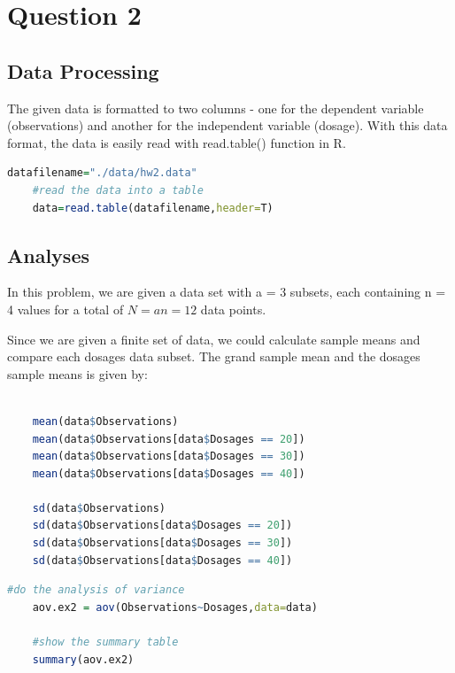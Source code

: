 \documentclass[11pt]{article}
\begin{document}
\clearpage






\section{Question 2}

\subsection{Data Processing}
The given data is formatted to two columns - one for the dependent variable (observations) and another for the independent variable (dosage). With this data format, the data is easily read with read.table() function in R.

\begin{lstlisting}[language=R]
    datafilename="./data/hw2.data"
    #read the data into a table
    data=read.table(datafilename,header=T)
\end{lstlisting}


\subsection{Analyses}
In this problem, we are given a data set with a = 3 subsets, each containing n = 4 values for a total of $\displaystyle N=an=12$ data points. 

Since we are given a finite set of data, we could calculate sample means and compare each dosages data subset. The grand sample mean and the dosages sample means is given by: 

\begin{lstlisting}[language=R]
    
    mean(data$Observations)
    mean(data$Observations[data$Dosages == 20])
    mean(data$Observations[data$Dosages == 30])
    mean(data$Observations[data$Dosages == 40])

    sd(data$Observations)
    sd(data$Observations[data$Dosages == 20])
    sd(data$Observations[data$Dosages == 30])
    sd(data$Observations[data$Dosages == 40])


\end{lstlisting}




\begin{lstlisting}[language=R]
    #do the analysis of variance
    aov.ex2 = aov(Observations~Dosages,data=data)

    #show the summary table
    summary(aov.ex2)
\end{lstlisting}
\end{document}
